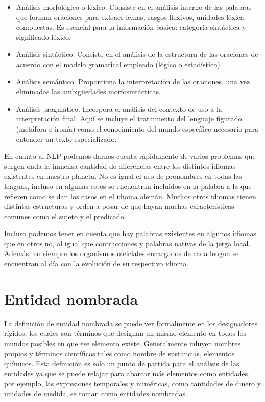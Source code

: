 \documentclass[runningheads]{llncs}
\begin{document}
\begin{itemize}
    \item Análisis morfológico o léxico. Consiste en el análisis interno de las palabras que forman oraciones para extraer lemas, rasgos flexivos, unidades léxica compuestas. Es esencial para la información básica: categoría sintáctica y significado léxico.
    \item Análisis sintáctico. Consiste en el análisis de la estructura de las oraciones de acuerdo con el modelo gramatical empleado (lógico o estadístico).
    \item Análisis semántico. Proporciona la interpretación de las oraciones, una vez eliminadas las ambigüedades morfosintácticas.
    \item Análisis pragmático. Incorpora el análisis del contexto de uso a la interpretación final. Aquí se incluye el tratamiento del lenguaje figurado (metáfora e ironía) como el conocimiento del mundo específico necesario para entender un texto especializado.
\end{itemize}


 
En cuanto al NLP podemos darnos cuenta rápidamente de varios problemas que surgen dada la inmensa cantidad de diferencias entre los distintos idiomas existentes en nuestro planeta. No es igual el uso de pronombres en todas las lenguas, incluso en algunas estos se encuentran incluidos en la palabra a la que refieren como se dan los casos en el idioma alemán. Muchos otros idiomas tienen distintas estructuras y orden a pesar de que hayan muchas características comunes como el sujeto y el predicado.

Incluso podemos tener en cuenta que hay palabras existentes en algunos idiomas que en otros no, al igual que contracciones y palabras nativas de la jerga local. Además, no siempre los organismos ofciciales encargados de cada lengua se encuentran al día con la evolución de su respectivo idioma.


\section{Entidad nombrada}

La definición de entidad nombrada se puede ver formalmente en los designadores rígidos\cite{rigid_designator}, los cuales son términos que designan un mismo elemento en todos los mundos posibles en que ese elemento existe. Generalmente inluyen nombres propios y términos científicos tales como nombre de sustancias, elementos químicos. Esta definición es solo un punto de partida para el análisis de las entidades ya que se puede relajar  para abarcar más elementos como entidades, por ejemplo, las expresiones temporales y numéricas, como cantidades de dinero y unidades de medida, se toman como entidades nombradas. 
\end{document}
